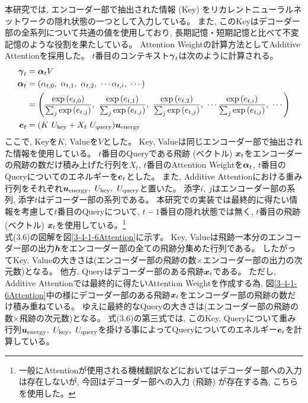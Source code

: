 本研究では, エンコーダー部で抽出された情報 (Key) をリカレントニューラルネットワークの隠れ状態の一つとして入力している。
また, このKeyはデコーダー部の全系列について共通の値を使用しており, 長期記憶・短期記憶と比べて不変記憶のような役割を果たしている。
Attention Weightの計算方法としてAdditive Attentionを採用した。
$t$番目のコンテキスト${\mbox{\boldmath{$\gamma$}}}_{t}$は次のように計算される。
\begin{equation}
 \begin{split}
  {\mbox{\boldmath{$\gamma$}}}_{t} 
  &= {\mbox{\boldmath{$\alpha$}}}_{t} V\\
  {\mbox{\boldmath{$\alpha$}}}_{t}
  &= (\alpha_{t,0},\ \alpha_{t,1},\ \alpha_{t,2},\ \cdots \alpha_{t,i},\ \cdots) \\
  &= \left(\frac{\exp{({{e}}_{t,0})}}{\sum_j \exp{({{e}}_{t,j})}},\ \frac{\exp{({{e}}_{t,1})}}{\sum_j \exp{({{e}}_{t,j})}},\ \frac{\exp{({{e}}_{t,2})}}{\sum_j \exp{({{e}}_{t,j})}},\  \cdots \frac{\exp{({{e}}_{t,i})}}{\sum_j \exp{({{e}}_{t,j})}},\ \cdots\right)\\
  {\mbox{\boldmath{$e$}}}_{t}
  &=(K\ U_{\rm key} + X_t\ U_{\rm query}) {\mbox{\boldmath{$u$}}}_{\rm energy} \\
 \end{split}
\end{equation}
ここで, Keyを$K$, Valueを$V$とした。
 Key, Valueは同じエンコーダー部で抽出された情報を使用している。
 $t$番目のQueryである飛跡 (ベクトル) ${\mbox{\boldmath{$x$}}}_{t}$をエンコーダーの飛跡の数だけ積み上げた行列を$X_t$, $t$番目のAttention Weightを${\mbox{\boldmath{$\alpha$}}}_{t}$, $t$番目のQueryについてのエネルギーを${\mbox{\boldmath{$e$}}}_{t}$とした。
また, Additive Attentionにおける重み行列をそれぞれ${\mbox{\boldmath{$u$}}}_{\rm energy},\  U_{\rm key},\ U_{\rm query}$と置いた。
添字$i,\ j$はエンコーダー部の系列, 添字$t$はデコーダー部の系列である。
本研究での実装では最終的に得たい情報を考慮して$t$番目のQueryについて, $t-1$番目の隠れ状態では無く, $t$番目の飛跡 (ベクトル) ${\mbox{\boldmath{$x$}}}_{t}$を使用している。\footnote{一般にAttentionが使用される機械翻訳などにおいてはデコーダー部への入力は存在しないが, 今回はデコーダー部への入力 (飛跡) が存在する為, こちらを使用した。}\\

式(3.6)の図解を図\ref{3-4-1-6Attention}に示す。
Key, Valueは飛跡一本分のエンコーダー部の出力${\mbox{\boldmath{$h$}}}$をエンコーダー部の全ての飛跡分集めた行列である。
したがってKey, Valueの大きさは(エンコーダー部の飛跡の数$\times$エンコーダー部の出力の次元数)となる。
他方, Queryはデコーダー部のある飛跡${\mbox{\boldmath{$x$}}}_{t}$である。
ただし, Additive Attentionでは最終的に得たいAttention Weightを作成する為, 図\ref{3-4-1-6Attention}中の様にデコーダー部のある飛跡${\mbox{\boldmath{$x$}}}_{t}$をエンコーダー部の飛跡の数だけ積み重ねている。
ゆえに最終的なQueryの大きさは(エンコーダー部の飛跡の数$\times$飛跡の次元数)となる。
式(3.6)の第三式では, このKey, Queryについて重み行列${\mbox{\boldmath{$u$}}}_{\rm energy},\  U_{\rm key},\ U_{\rm query}$を掛ける事によってQueryについてのエネルギー${\mbox{\boldmath{$e$}}}_{t}$を計算している。

